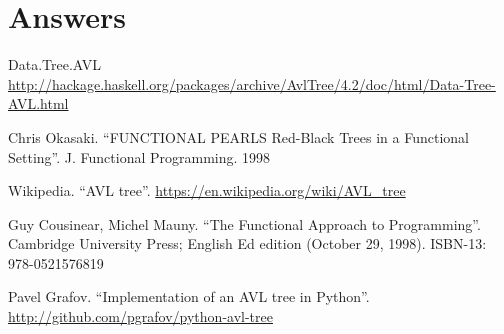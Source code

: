 \documentclass[b5paper]{article}
\begin{document}
\ifx\wholebook\relax \else
\section{Answers}
\shipoutAnswer

\begin{thebibliography}{99}

Data.Tree.AVL \url{http://hackage.haskell.org/packages/archive/AvlTree/4.2/doc/html/Data-Tree-AVL.html}

Chris Okasaki. ``FUNCTIONAL PEARLS Red-Black Trees in a Functional Setting''. J. Functional Programming. 1998

Wikipedia. ``AVL tree''. \url{https://en.wikipedia.org/wiki/AVL_tree}

Guy Cousinear, Michel Mauny. ``The Functional Approach to Programming''. Cambridge University Press; English Ed edition (October 29, 1998). ISBN-13: 978-0521576819

Pavel Grafov. ``Implementation of an AVL tree in Python''. \url{http://github.com/pgrafov/python-avl-tree}

\end{thebibliography}

\expandafter\enddocument
\fi
\end{document}
